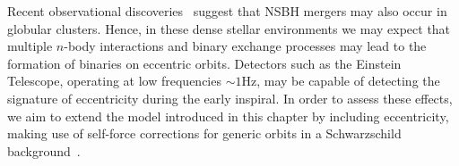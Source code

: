 Recent observational discoveries~\cite{Morscher:2013} suggest that NSBH mergers may also occur in globular clusters. Hence, in these dense stellar environments we may expect that multiple \(n\)-body interactions and binary exchange processes may lead to the formation of binaries on eccentric orbits. Detectors such as the Einstein Telescope, operating at low frequencies \(\sim 1\)Hz, may be capable of detecting the signature of eccentricity during the early inspiral. In order to assess these effects, we aim to extend the model introduced in this chapter by including eccentricity, making use of self-force corrections for generic orbits in a Schwarzschild background~\cite{wargar}. 

